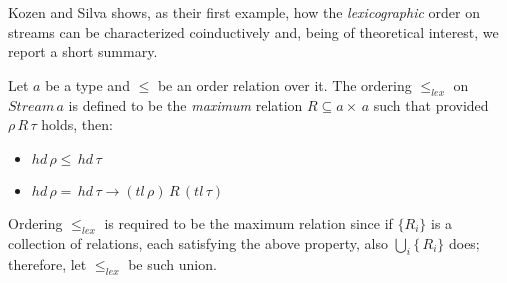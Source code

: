 Kozen and Silva shows, as their first example, how the \emph{lexicographic} order
on streams can be characterized coinductively and, being of theoretical interest,
we report a short summary.

Let $a$ be a type and $\leq$ be an order relation over it. The ordering $\leq_{lex}$
on $Stream\,a$ is defined to be the \emph{maximum} relation $R\subseteq a\times\,a$ 
such that provided $\rho\,R\,\tau$ holds, then:
\begin{itemize}
    \item $hd\,\rho\leq\,hd\,\tau$ 
    \item $hd\,\rho=\,hd\,\tau \rightarrow (tl\,\rho)\,R\,(tl\,\tau)$ 
\end{itemize}
Ordering $\leq_{lex}$ is required to be the maximum relation since if 
$\lbrace R_{i}\rbrace$ is a collection of relations, each satisfying the above
property, also $\bigcup_{i}\lbrace\,R_{i}\rbrace$ does; therefore, let $\leq_{lex}$
be such union. 










